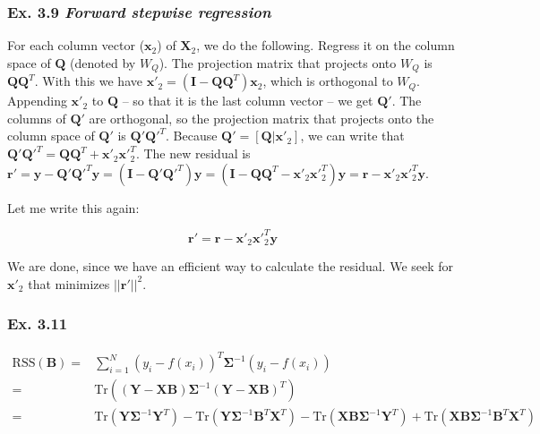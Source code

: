 \documentclass{article}
\begin{document}
\subsubsection{Ex. 3.9 \emph{Forward stepwise regression}}

For each column vector ($\mathbf{x}_2$) of $\mathbf{X}_2$, we do the following. Regress it on the column space of $\mathbf{Q}$ (denoted by $W_Q$). The projection matrix that projects onto $W_Q$ is $\mathbf{Q}\mathbf{Q}^T$. With this we have $\mathbf{x}'_2 = (\mathbf{I} - \mathbf{Q}\mathbf{Q}^T) \mathbf{x}_2$, which is orthogonal to $W_Q$. Appending $\mathbf{x}'_2$ to $\mathbf{Q}$ -- so that it is the last column vector -- we get $\mathbf{Q}'$. The columns of $\mathbf{Q}'$ are orthogonal, so the projection matrix that projects onto the column space of $\mathbf{Q}'$ is $\mathbf{Q}'\mathbf{Q}'^{T}$. Because $\mathbf{Q}' = [\mathbf{Q} | \mathbf{x}'_2]$, we can write that $\mathbf{Q}'\mathbf{Q}'^{T} = \mathbf{Q}\mathbf{Q}^{T} + \mathbf{x}'_2 \mathbf{x}'^T_2$. The new residual is $\mathbf{r}' = \mathbf{y} - \mathbf{Q}'\mathbf{Q}'^T\mathbf{y} = (\mathbf{I} - \mathbf{Q}'\mathbf{Q}'^T) \mathbf{y} = (\mathbf{I} - \mathbf{Q}\mathbf{Q}^T - \mathbf{x}'_2 \mathbf{x}'^T_2) \mathbf{y} = \mathbf{r} - \mathbf{x}'_2 \mathbf{x}'^T_2 \mathbf{y}$.

Let me write this again:

\[
    \mathbf{r}' = \mathbf{r} - \mathbf{x}'_2 \mathbf{x}'^T_2 \mathbf{y}
\]

We are done, since we have an efficient way to calculate the residual. We seek for $\mathbf{x}'_2$ that minimizes $||\mathbf{r}'||^2$.

\subsubsection{Ex. 3.11}

\[
\begin{split}
\text{RSS}(\mathbf{B}) =& \sum_{i=1}^{N} (y_i -f(x_i))^T \mathbf{\Sigma}^{-1} (y_i - f(x_i))\\
=& \text{Tr}\left( (\mathbf{Y} - \mathbf{X} \mathbf{B}) \mathbf{\Sigma}^{-1} (\mathbf{Y} - \mathbf{X} \mathbf{B})^T \right)\\
=&\text{Tr}(\mathbf{Y} \mathbf{\Sigma}^{-1} \mathbf{Y}^T) - \text{Tr}(\mathbf{Y} \mathbf{\Sigma}^{-1} \mathbf{B}^T \mathbf{X}^T) - \text{Tr}(\mathbf{X}\mathbf{B}\mathbf{\Sigma}^{-1}\mathbf{Y}^T) + \text{Tr}(\mathbf{X} \mathbf{B} \mathbf{\Sigma}^{-1} \mathbf{B}^T \mathbf{X}^T)
\end{split}
\]
\end{document}

